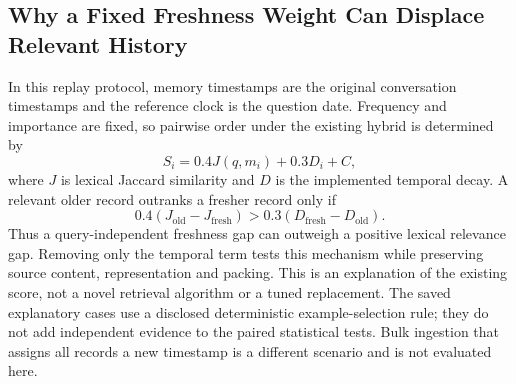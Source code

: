 \subsection{Why a Fixed Freshness Weight Can Displace Relevant History}
In this replay protocol, memory timestamps are the original conversation timestamps and the reference clock is the question date. Frequency and importance are fixed, so pairwise order under the existing hybrid is determined by
\[
S_i = 0.4 J(q,m_i) + 0.3 D_i + C,
\]
where $J$ is lexical Jaccard similarity and $D$ is the implemented temporal decay. A relevant older record outranks a fresher record only if
\[
0.4(J_{\mathrm{old}}-J_{\mathrm{fresh}})
> 0.3(D_{\mathrm{fresh}}-D_{\mathrm{old}}).
\]
Thus a query-independent freshness gap can outweigh a positive lexical relevance gap. Removing only the temporal term tests this mechanism while preserving source content, representation and packing. This is an explanation of the existing score, not a novel retrieval algorithm or a tuned replacement. The saved explanatory cases use a disclosed deterministic example-selection rule; they do not add independent evidence to the paired statistical tests. Bulk ingestion that assigns all records a new timestamp is a different scenario and is not evaluated here.
